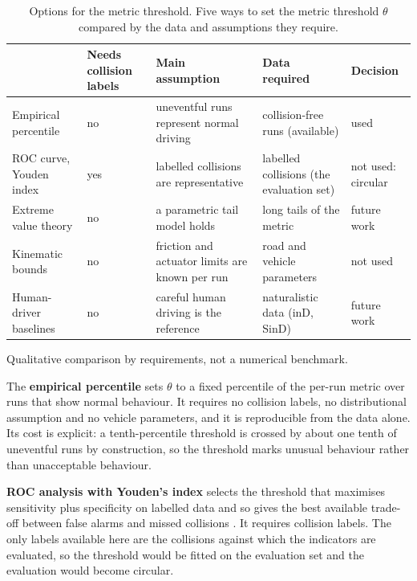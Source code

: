 \begin{table}[htbp]
\centering
\caption[Options for the metric threshold]{Options for the metric threshold. Five ways to set the metric threshold $\theta$ compared by the data and assumptions they require.}
\label{tab:threshold_methods}
\footnotesize
\setlength{\tabcolsep}{4pt}
\begin{tabular}{@{}>{\raggedright\arraybackslash}p{2.8cm}>{\raggedright\arraybackslash}p{2.1cm}>{\raggedright\arraybackslash}p{3.8cm}>{\raggedright\arraybackslash}p{3.4cm}>{\raggedright\arraybackslash}p{2.3cm}@{}}
\toprule
{\bfseries Method} & {\bfseries Needs collision labels} & {\bfseries Main assumption} & {\bfseries Data required} & {\bfseries Decision} \\
\midrule
Empirical percentile & no & uneventful runs represent normal driving & collision-free runs (available) & used \\
ROC curve, Youden index & yes & labelled collisions are representative & labelled collisions (the evaluation set) & not used: circular \\
Extreme value theory & no & a parametric tail model holds & long tails of the metric & future work \\
Kinematic bounds & no & friction and actuator limits are known per run & road and vehicle parameters & not used \\
Human-driver baselines & no & careful human driving is the reference & naturalistic data (inD, SinD) & future work \\
\bottomrule
\end{tabular}
\par\smallskip\footnotesize\raggedright Qualitative comparison by requirements, not a numerical benchmark.
\end{table}

The \textbf{empirical percentile} sets $\theta$ to a fixed percentile of the
per-run metric over runs that show normal behaviour. It requires no collision
labels, no distributional assumption and no vehicle parameters, and it is
reproducible from the data alone. Its cost is explicit: a tenth-percentile
threshold is crossed by about one tenth of uneventful runs by construction, so
the threshold marks unusual behaviour rather than unacceptable behaviour.

\textbf{ROC analysis with Youden's index} selects the threshold that maximises
sensitivity plus specificity on labelled data and so gives the best available
trade-off between false alarms and missed collisions \cite{youden1950}. It requires collision labels. The only labels available here are the
collisions against which the indicators are evaluated, so the threshold would be
fitted on the evaluation set and the evaluation would become circular.

